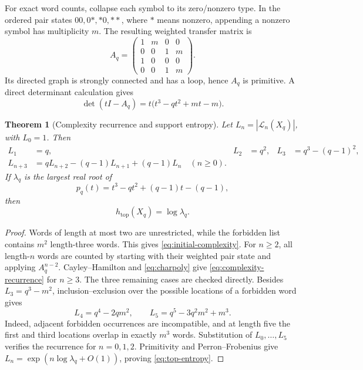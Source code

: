 \documentclass[11pt,a4paper]{amsart}
\newtheorem{theorem}{Theorem}[section]
\theoremstyle{definition}
\theoremstyle{remark}
\newcommand{\cL}{\mathcal L}
\newcommand{\htop}{h_{\mathrm{top}}}
\begin{document}
For exact word counts, collapse each symbol to its zero/nonzero type.  In the
ordered pair states $00,0*,*0,**$, where $*$ means nonzero, appending a
nonzero symbol has multiplicity $m$.  The resulting weighted transfer matrix
is
\begin{equation}\label{eq:transfer}
 A_q=
 \begin{pmatrix}
 1&m&0&0\\
 0&0&1&m\\
 1&0&0&0\\
 0&0&1&m
 \end{pmatrix}.
\end{equation}
Its directed graph is strongly connected and has a loop, hence $A_q$ is
primitive.  A direct determinant calculation gives
\begin{equation}\label{eq:charpoly}
 \det(tI-A_q)
 =t\bigl(t^3-qt^2+mt-m\bigr).
\end{equation}

\begin{theorem}[Complexity recurrence and support entropy]
\label{thm:complexity}
Let $L_n=|\cL_n(X_q)|$, with $L_0=1$.  Then
\begin{align}
 L_1&=q, & L_2&=q^2, & L_3&=q^3-(q-1)^2,
 \label{eq:initial-complexity}\\
 L_{n+3}&=qL_{n+2}-(q-1)L_{n+1}+(q-1)L_n
 \quad(n\geq0).\label{eq:complexity-recurrence}
\end{align}
If $\lambda_q$ is the largest real root of
\begin{equation}\label{eq:pf-cubic}
 p_q(t)=t^3-qt^2+(q-1)t-(q-1),
\end{equation}
then
\begin{equation}\label{eq:top-entropy}
 \htop(X_q)=\log\lambda_q.
\end{equation}
\end{theorem}

\begin{proof}
Words of length at most two are unrestricted, while the forbidden list
contains $m^2$ length-three words.  This gives
\eqref{eq:initial-complexity}.  For $n\geq2$, all length-$n$ words are counted
by starting with their weighted pair state and applying $A_q^{n-2}$.
Cayley--Hamilton and \eqref{eq:charpoly} give
\eqref{eq:complexity-recurrence} for $n\geq3$.  The three remaining cases are
checked directly.  Besides $L_3=q^3-m^2$, inclusion--exclusion over the
possible locations of a forbidden word gives
\[
 L_4=q^4-2qm^2,
 \qquad
 L_5=q^5-3q^2m^2+m^3.
\]
Indeed, adjacent forbidden occurrences are incompatible, and at length five
the first and third locations overlap in exactly $m^3$ words.  Substitution
of $L_0,\ldots,L_5$ verifies the recurrence for $n=0,1,2$.
Primitivity and Perron--Frobenius give
$L_n=\exp(n\log\lambda_q+O(1))$, proving \eqref{eq:top-entropy}.
\end{proof}
\end{document}
